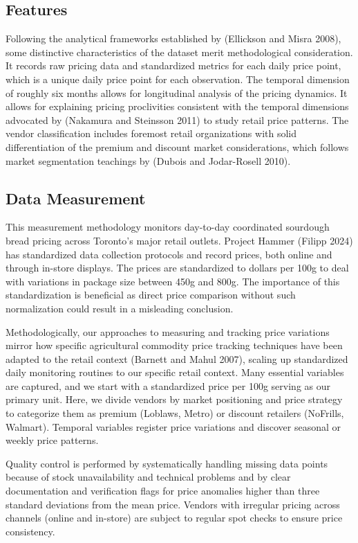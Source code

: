 \documentclass[
  letterpaper,
  DIV=11,
  numbers=noendperiod]{scrartcl}
\begin{document}
\subsection{Features}\label{features}

Following the analytical frameworks established by (Ellickson and Misra
2008), some distinctive characteristics of the dataset merit
methodological consideration. It records raw pricing data and
standardized metrics for each daily price point, which is a unique daily
price point for each observation. The temporal dimension of roughly six
months allows for longitudinal analysis of the pricing dynamics. It
allows for explaining pricing proclivities consistent with the temporal
dimensions advocated by (Nakamura and Steinsson 2011) to study retail
price patterns. The vendor classification includes foremost retail
organizations with solid differentiation of the premium and discount
market considerations, which follows market segmentation teachings by
(Dubois and Jodar-Rosell 2010).

\subsection{Data Measurement}\label{data-measurement}

This measurement methodology monitors day-to-day coordinated sourdough
bread pricing across Toronto's major retail outlets. Project Hammer
(Filipp 2024) has standardized data collection protocols and record
prices, both online and through in-store displays. The prices are
standardized to dollars per 100g to deal with variations in package size
between 450g and 800g. The importance of this standardization is
beneficial as direct price comparison without such normalization could
result in a misleading conclusion.

Methodologically, our approaches to measuring and tracking price
variations mirror how specific agricultural commodity price tracking
techniques have been adapted to the retail context (Barnett and Mahul
2007), scaling up standardized daily monitoring routines to our specific
retail context. Many essential variables are captured, and we start with
a standardized price per 100g serving as our primary unit. Here, we
divide vendors by market positioning and price strategy to categorize
them as premium (Loblaws, Metro) or discount retailers (NoFrills,
Walmart). Temporal variables register price variations and discover
seasonal or weekly price patterns.

Quality control is performed by systematically handling missing data
points because of stock unavailability and technical problems and by
clear documentation and verification flags for price anomalies higher
than three standard deviations from the mean price. Vendors with
irregular pricing across channels (online and in-store) are subject to
regular spot checks to ensure price consistency.
\end{document}
